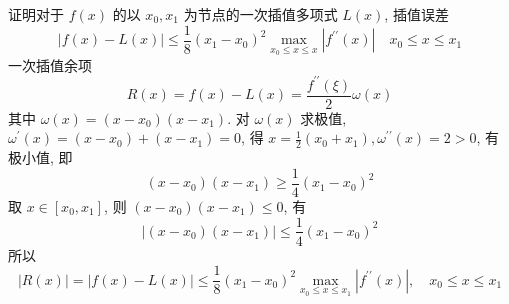 \begin{tcolorbox}[enhanced,colback=10,colframe=9,breakable,coltitle=green!25!black,title=2024]
  证明对于 $ f(x) $ 的以 $ x_{0}, x_{1} $ 为节点的一次插值多项式 $ L(x) $, 插值误差
$$
|f(x)-L(x)| \leqslant \frac{1}{8}\left(x_{1}-x_{0}\right)^{2} \max _{x_{0} \leqslant x \leqslant x}\left|f^{\prime \prime}(x)\right| \quad x_{0} \leqslant x \leqslant x_{1}
$$
\tcblower
 一次插值余项
$$
R(x)=f(x)-L(x)=\frac{f^{\prime \prime}(\xi)}{2} \omega(x)
$$
其中 $ \omega(x)=\left(x-x_{0}\right)\left(x-x_{1}\right) $.
对 $ \omega(x) $ 求极值, $ \omega^{\prime}(x)=\left(x-x_{0}\right)+\left(x-x_{1}\right)=0 $, 得 $ x=\frac{1}{2}\left(x_{0}+x_{1}\right), \omega^{\prime \prime}(x)=2>0 $, 有极小值, 即
$$
\left(x-x_{0}\right)\left(x-x_{1}\right) \geqslant \frac{1}{4}\left(x_{1}-x_{0}\right)^{2}
$$
取 $ x \in\left[x_{0}, x_{1}\right] $, 则 $ \left(x-x_{0}\right)\left(x-x_{1}\right) \leqslant 0 $, 有
$$
\left|\left(x-x_{0}\right)\left(x-x_{1}\right)\right| \leqslant \frac{1}{4}\left(x_{1}-x_{0}\right)^{2}
$$
所以
$$
|R(x)|=|f(x)-L(x)| \leqslant \frac{1}{8}\left(x_{1}-x_{0}\right)^{2} \max _{x_{0} \leqslant x \leqslant x_{1}}\left|f^{\prime \prime}(x)\right|, \quad x_{0} \leqslant x \leqslant x_{1}
$$
\end{tcolorbox}



